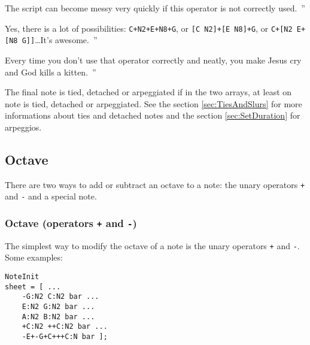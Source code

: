 \documentclass{article}
\newcommand{\wikipedia}{\textsc{Wikipedia}\xspace}
\newcommand{\wiktionary}{\textsc{Wiktionary}\xspace}
\newcommand{\google}{\textsc{Google}\xspace}
\newcommand{\footurl}[1]{\footnote{\url{#1}}\xspace}
\newenvironment{meenv}{ \par \noindent \makebox[6em][r]{ \textcolor{mecolor}{Me}: `` --~}}{~''}
\newenvironment{myselfenv}{ \par \noindent \makebox[6em][r]{ \textcolor{myselfcolor}{Myself}: `` --~}}{~''}
\newcommand{\me}[1]{\begin{meenv}#1\end{meenv}}
\newcommand{\myself}[1]{\begin{myselfenv}#1\end{myselfenv}}
\begin{document}
\myself{The script can become messy very quickly if this operator is not correctly used.}
\me{Yes, there is a lot of possibilities: \lstinline!C+N2+E+N8+G!, or \lstinline![C N2]+[E N8]+G!, or \lstinline!C+[N2 E+[N8 G]]!\dots It's awesome.}
\myself{Every time you don't use that operator correctly and neatly, you make Jesus cry and God kills a kitten.}%

The final note is tied, detached or arpeggiated if in the two arrays, at least on note is tied, detached or arpeggiated. See the section \ref{sec:TiesAndSlurs} for more informations about ties and detached notes and the section \ref{sec:SetDuration} for arpeggios.


\subsection{Octave}
\label{sec:Octave}

There are two ways to add or subtract an octave to a note: the unary operators \lstinline!+! and \lstinline!-! and a special note.

\subsubsection{Octave (operators \lstinline!+! and \lstinline!-!)}
\label{sec:OctaveOperators}

The simplest way to modify the octave of a note is the unary operators \lstinline!+! and \lstinline!-!. Some examples: \\

\begin{lstlisting}
NoteInit
sheet = [ ...
	-G:N2 C:N2 bar ...
	E:N2 G:N2 bar ...
	A:N2 B:N2 bar ...
	+C:N2 ++C:N2 bar ...
	-E+-G+C+++C:N bar ];
\end{lstlisting}
\end{document}
